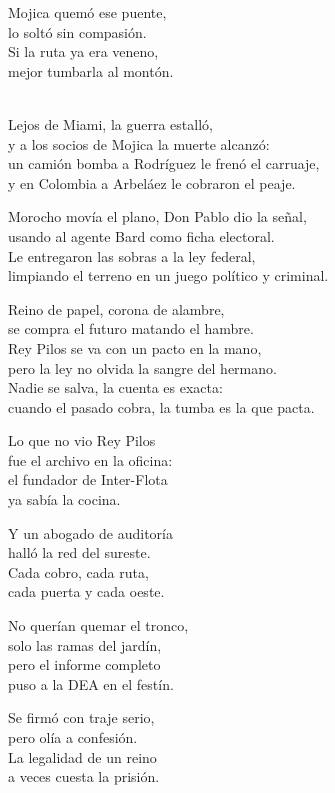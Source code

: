 \begin{lyrics}
Mojica quemó ese puente,\\
lo soltó sin compasión.\\
Si la ruta ya era veneno,\\
mejor tumbarla al montón.

\\
Lejos de Miami, la guerra estalló,\\
y a los socios de Mojica la muerte alcanzó:\\
un camión bomba a Rodríguez le frenó el carruaje,\\
y en Colombia a Arbeláez le cobraron el peaje.

Morocho movía el plano, Don Pablo dio la señal,\\
usando al agente Bard como ficha electoral.\\
Le entregaron las sobras a la ley federal,\\
limpiando el terreno en un juego político y criminal.

Reino de papel, corona de alambre,\\
se compra el futuro matando el hambre.\\
Rey Pilos se va con un pacto en la mano,\\
pero la ley no olvida la sangre del hermano.\\
Nadie se salva, la cuenta es exacta:\\
cuando el pasado cobra, la tumba es la que pacta.

Lo que no vio Rey Pilos\\
fue el archivo en la oficina:\\
el fundador de Inter-Flota\\
ya sabía la cocina.

Y un abogado de auditoría\\
halló la red del sureste.\\
Cada cobro, cada ruta,\\
cada puerta y cada oeste.

No querían quemar el tronco,\\
solo las ramas del jardín,\\
pero el informe completo\\
puso a la DEA en el festín.

Se firmó con traje serio,\\
pero olía a confesión.\\
La legalidad de un reino\\
a veces cuesta la prisión.


\end{lyrics}
